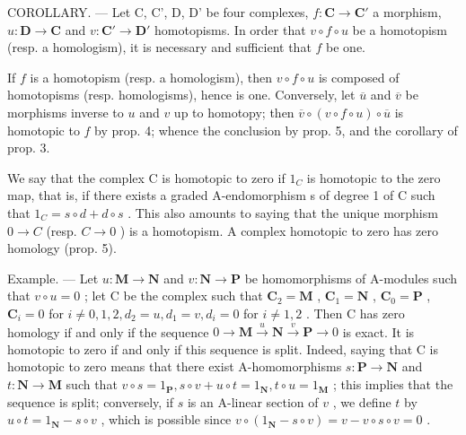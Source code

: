 COROLLARY. --- Let C, C', D, D' be four complexes, \(f: \mathbf{C} \to \mathbf{C}'\) a morphism, \(u: \mathbf{D} \to \mathbf{C}\) and \(v: \mathbf{C}' \to \mathbf{D}'\) homotopisms. In order that \(v \circ f \circ u\) be a homotopism (resp. a homologism), it is necessary and sufficient that \(f\) be one.

If \(f\) is a homotopism (resp. a homologism), then \(v \circ f \circ u\) is composed of homotopisms (resp. homologisms), hence is one. Conversely, let \(\overline{u}\) and \(\overline{v}\) be morphisms inverse to \(u\) and \(v\) up to homotopy; then \(\overline{v} \circ (v \circ f \circ u) \circ \overline{u}\) is homotopic to \(f\) by prop. 4; whence the conclusion by prop. 5, and the corollary of prop. 3.

We say that the complex C is homotopic to zero if \(1_{C}\) is homotopic to the zero map, that is, if there exists a graded A-endomorphism s of degree 1 of C such that \(1_{C} = s \circ d + d \circ s\) . This also amounts to saying that the unique morphism \(0 \to C\) (resp. \(C \to 0\) ) is a homotopism. A complex homotopic to zero has zero homology (prop. 5).

Example. --- Let \(u: \mathbf{M} \to \mathbf{N}\) and \(v: \mathbf{N} \to \mathbf{P}\) be homomorphisms of A-modules such that \(v \circ u = 0\) ; let C be the complex such that \(\mathbf{C}_2 = \mathbf{M}\) , \(\mathbf{C}_1 = \mathbf{N}\) , \(\mathbf{C}_0 = \mathbf{P}\) , \(\mathbf{C}_i = 0\) for \(i \neq 0, 1, 2, d_2 = u, d_1 = v, d_i = 0\) for \(i \neq 1, 2\) . Then C has zero homology if and only if the sequence \(0 \to \mathbf{M} \xrightarrow{u} \mathbf{N} \xrightarrow{v} \mathbf{P} \to 0\) is exact. It is homotopic to zero if and only if this sequence is split. Indeed, saying that C is homotopic to zero means that there exist A-homomorphisms \(s: \mathbf{P} \to \mathbf{N}\) and \(t: \mathbf{N} \to \mathbf{M}\) such that \(v \circ s = 1_{\mathbf{P}}, s \circ v + u \circ t = 1_{\mathbf{N}}, t \circ u = 1_{\mathbf{M}}\) ; this implies that the sequence is split; conversely, if \(s\) is an A-linear section of \(v\) , we define \(t\) by \(u \circ t = 1_{\mathbf{N}} - s \circ v\) , which is possible since \(v \circ (1_{\mathbf{N}} - s \circ v) = v - v \circ s \circ v = 0\) .


